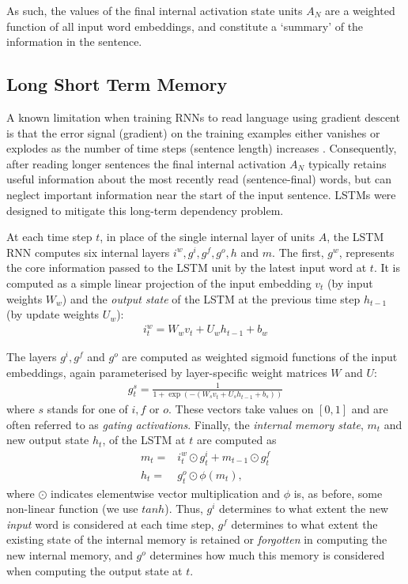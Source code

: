 As such, the values of the final internal activation state units \(A_N\) are a
weighted function of all input word embeddings, and constitute a `summary' of
the information in the sentence.

\subsection{Long Short Term Memory}

A known limitation when training RNNs to read language using gradient descent is that the error signal (gradient) on the training examples either vanishes or explodes as the number of time steps (sentence length) increases \cite{bengio1994learning}. Consequently, after reading longer sentences the final internal activation \(A_N\) typically retains useful information about the most recently read (sentence-final) words, but can neglect important information near the start of the input sentence. LSTMs  \cite{hochreiter1997long} were designed to mitigate this long-term dependency problem. 

At each time step \(t\), in place of the single internal layer of units \(A\),
the LSTM RNN computes six internal layers \(i^w , g^i, g^f , g^o, h\) and
\(m\). The first, \(g^w\), represents the core information passed to the LSTM
unit by the latest input word at \(t\). It is computed as a simple linear
projection of the input embedding \(v_t\) (by input weights \(W_w\)) and the
\emph{output state} of the LSTM at the previous time step \(h_{t-1}\) (by
update weights \(U_w\)):
\begin{align*}
i_t^w = W_w v_t + U_wh_{t-1} +  b_w
\end{align*}

The layers \(g^i, g^f \) and \(g^o \) are computed as weighted sigmoid
functions of the input embeddings, again parameterised by layer-specific weight
matrices \(W\) and \(U\):
\begin{align*}
g_t^s = \frac{1}{1+\exp(-(W_s v_t + U_sh_{t-1} + b_s  ))}
\end{align*}
where \(s\) stands for one of \(i,f\) or \(o\). These vectors take
values on \([0,1]\) and are often referred to as \emph{gating activations}.
Finally, the \emph{internal memory state}, \(m_t\) and new output state
\(h_t\), of the LSTM at \(t\) are computed as
\begin{align*}
    m_t =& i_t^w \odot g_t^i + m_{t-1} \odot g_t^f \\
    h_t =& g_t^o \odot \phi(m_t), 
\end{align*}
where \(\odot\) indicates elementwise vector multiplication and \(\phi\) is, as
before, some non-linear function (we use \(tanh\)). Thus, \(g^i\) determines to
what extent the new \emph{input} word is considered at each time step, \(g^f\)
determines to what extent the existing state of the internal memory is retained
or \emph{forgotten} in computing the new internal memory, and \(g^o\)
determines how much this memory is considered when computing the output state
at \(t\). 


